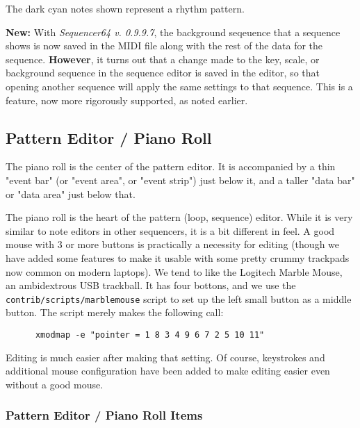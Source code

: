    The dark cyan notes shown represent a rhythm pattern.

   \textbf{New:}
   With \textsl{Sequencer64 v. 0.9.9.7}, the background seqeuence that a
   sequence shows is now saved in the MIDI file along with the rest of the
   data for the sequence.
   \textbf{However},
   it turns out that a change made to the key, scale, or background sequence in
   the sequence editor is saved in the editor, so that opening another sequence
   will apply the same settings to that sequence.  This is a feature, now
   more rigorously supported, as noted earlier.

\subsection{Pattern Editor / Piano Roll}
\label{subsec:seq64_pattern_editor_piano_roll}

   The piano roll is the center of the pattern editor.  It is accompanied by a
   thin "event bar" (or "event area", or "event strip") just below it,
   and a taller "data bar" or "data area" just below that.

   The piano roll is the heart of the pattern (loop, sequence) editor.
   While it is very similar to note editors in other sequencers, it is a bit
   different in feel.  A good mouse with 3 or more buttons is practically a
   necessity for editing (though we have added some features to make it
   usable with some pretty crummy trackpads now common on modern laptops).
   We tend to like the Logitech Marble Mouse, an
   ambidextrous USB trackball.  It has four bottons, and we use the
   \texttt{contrib/scripts/marblemouse} script to set up the left small
   button as a middle button.  The script merely makes the following call:

   \begin{verbatim}
      xmodmap -e "pointer = 1 8 3 4 9 6 7 2 5 10 11"
   \end{verbatim}

   Editing is much easier after making that setting.   Of course, keystrokes
   and additional mouse configuration have been added to make editing easier
   even without a good mouse.

\subsubsection{Pattern Editor / Piano Roll Items}
\label{subsubsec:seq64_pattern_editor_piano_roll_items}

